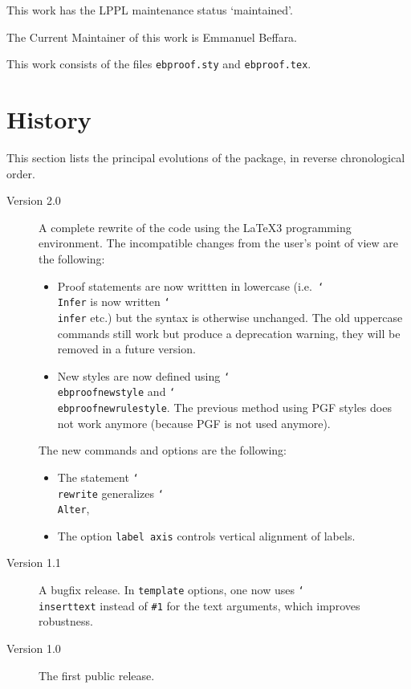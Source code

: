 \documentclass{article}
\newcommand\lit[1]{\texttt{#1}}
\newcommand\cs[1]{\lit{\char`\\#1}}
\newcommand\opt[1]{\lit{#1}}
\begin{document}
This work has the LPPL maintenance status `maintained'.

The Current Maintainer of this work is Emmanuel Beffara.

This work consists of the files \texttt{ebproof.sty} and \texttt{ebproof.tex}.

\section{History}

This section lists the principal evolutions of the package, in reverse
chronological order.
\begin{description}
\item[Version 2.0]
  A complete rewrite of the code using the \LaTeX3 programming environment. 
  The incompatible changes from the user's point of view are the following:
  \begin{itemize}
  \item Proof statements are now writtten in lowercase ({i.e.} \cs{Infer} is
    now written \cs{infer} etc.) but the syntax is otherwise unchanged.
    The old uppercase commands still work but produce a deprecation warning,
    they will be removed in a future version.
  \item New styles are now defined using \cs{ebproofnewstyle} and
    \cs{ebproofnewrulestyle}. The previous method using PGF styles does not
    work anymore (because PGF is not used anymore).
  \end{itemize}
  The new commands and options are the following:
  \begin{itemize}
  \item The statement \cs{rewrite} generalizes \cs{Alter},
  \item The option \opt{label axis} controls vertical alignment of labels.
  \end{itemize}
\item[Version 1.1]
  A bugfix release.
  In \opt{template} options, one now uses \cs{inserttext} instead of \lit{\#1}
  for the text arguments, which improves robustness.
\item[Version 1.0]
  The first public release.
\end{description}
\end{document}
